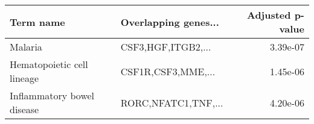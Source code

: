 \begin{tabular}{llr}
\toprule
                 Term name & Overlapping genes... &  Adjusted p-value \\
\midrule
                   Malaria &   CSF3,HGF,ITGB2,... &          3.39e-07 \\
Hematopoietic cell lineage &   CSF1R,CSF3,MME,... &          1.45e-06 \\
Inflammatory bowel disease &  RORC,NFATC1,TNF,... &          4.20e-06 \\
\bottomrule
\end{tabular}
